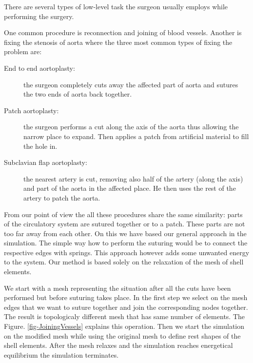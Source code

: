 There are several types of low-level task the surgeon usually employs while
performing the surgery.

One common procedure is reconnection and joining of blood vessels. Another
is fixing the stenosis of aorta where the three most common types of fixing
the problem are:

\begin{description}

  \item[End to end aortoplasty:] the surgeon completely cuts away the
    affected part of aorta and sutures the two ends of aorta back together.

  \item[Patch aortoplasty:] the surgeon performs a cut along the axis of
    the aorta thus allowing the narrow place to expand. Then applies a
    patch from artificial material to fill the hole in.

  \item[Subclavian flap aortoplasty:] the nearest artery is cut,
    removing also half of the artery (along the axis) and part of the
    aorta in the affected place. He then uses the rest of the artery to
    patch the aorta.

\end{description}

From our point of view the all these procedures share the same similarity:
parts of the circulatory system are sutured together or to a patch. These
parts are not too far away from each other. On this we have based our
general approach in the simulation. The simple way how to perform the
suturing would be to connect the respective edges with springs. This
approach however adds some unwanted energy to the system. Our method is
based solely on the relaxation of the mesh of shell elements.

We start with a mesh representing the situation after all the cuts have
been performed but before suturing takes place. In the first step we select
on the mesh edges that we want to suture together and join the
corresponding nodes together. The result is topologicaly different mesh
that has same number of elements. The Figure. \ref{fig-JoiningVessels} explains
this operation. Then we start the simulation on the modified mesh while
using the original mesh to define rest shapes of the shell elements. After
the mesh relaxes and the simulation reaches energetical equilibrium the
simulation terminates.

